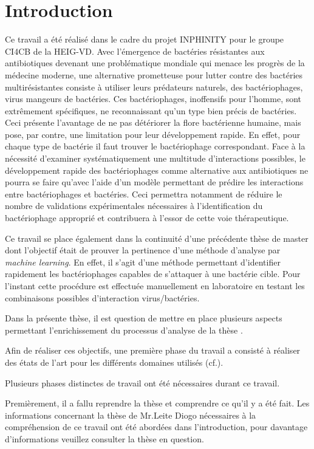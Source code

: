 \chapter{Introduction}
\label{ch:introduction}

Ce travail a été réalisé dans le cadre du projet INPHINITY pour le groupe CI4CB de la HEIG-VD. Avec l'émergence de bactéries résistantes aux antibiotiques devenant une problématique mondiale qui menace les progrès de la médecine moderne, une alternative prometteuse pour lutter contre des bactéries multirésistantes consiste à utiliser leurs prédateurs naturels, des bactériophages, virus mangeurs de bactéries. Ces bactériophages, inoffensifs pour l'homme, sont extrêmement spécifiques, ne reconnaissant qu'un type bien précis de bactéries. Ceci présente l'avantage de ne pas détériorer la flore bactérienne humaine, mais pose, par contre, une limitation pour leur développement rapide. En effet, pour chaque type de bactérie il faut trouver le bactériophage correspondant. Face à la nécessité d'examiner systématiquement une multitude d'interactions possibles, le développement rapide des bactériophages comme alternative aux antibiotiques ne pourra se faire qu'avec l'aide d'un modèle permettant de prédire les interactions entre bactériophages et bactéries. Ceci permettra notamment de réduire le nombre de validations expérimentales nécessaires à l'identification du bactériophage approprié et contribuera à l'essor de cette voie thérapeutique.

Ce travail se place également dans la continuité d'une précédente thèse de master dont l'objectif était de prouver la pertinence d'une méthode d'analyse par \emph{machine learning}. En effet, il s'agit d'une méthode permettant d'identifier rapidement les bactériophages capables de s'attaquer à une bactérie cible. Pour l'instant cette procédure est effectuée manuellement en laboratoire en testant les combinaisons possibles d'interaction virus/bactéries.

Dans la présente thèse, il est question de mettre en place plusieurs aspects permettant l'enrichissement du processus d'analyse de la thèse \thLeite. 

Afin de réaliser ces objectifs, une première phase du travail a consisté à réaliser des états de l'art pour les différents domaines utilisés (cf.).

Plusieurs phases distinctes de travail ont été nécessaires durant ce travail.

Premièrement, il a fallu reprendre la thèse \thLeite et comprendre ce qu'il y a été fait. Les informations concernant la thèse de Mr.Leite Diogo nécessaires à la compréhension de ce travail ont été abordées dans l'introduction, pour davantage d'informations veuillez consulter la thèse en question.

